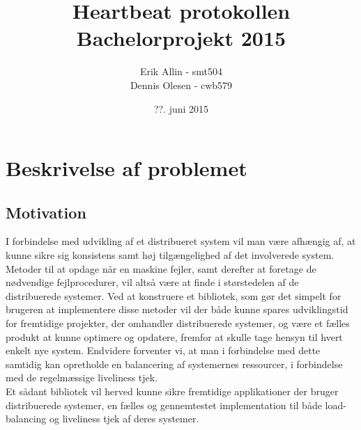 \documentclass[a4paper,12pt]{article}
\title{Heartbeat protokollen
\\
Bachelorprojekt 2015}
\author{Erik Allin - smt504 \\ Dennis Olesen - cwb579}
\date{??. juni 2015}
\begin{document}
\maketitle
\newpage


\section*{Beskrivelse af problemet}
\subsection*{Motivation}
I forbindelse med udvikling af et distribueret system vil man være afhængig af, at kunne sikre sig konsistens samt høj tilgængelighed af det involverede system. Metoder til at opdage når en maskine fejler, samt derefter at foretage de nødvendige fejlprocedurer, vil altså være at finde i størstedelen af de distribuerede systemer.
Ved at konstruere et bibliotek, som gør det simpelt for brugeren at implementere disse metoder vil der både kunne spares udviklingstid for fremtidige projekter, der omhandler distribuerede systemer, og være et fælles produkt at kunne optimere og opdatere, fremfor at skulle tage hensyn til hvert enkelt nye system. Endvidere forventer vi, at man i forbindelse med dette samtidig kan opretholde en balancering af systemernes ressourcer, i forbindelse med de regelmæssige liveliness tjek. 
\\
Et sådant bibliotek vil herved kunne sikre fremtidige applikationer der bruger distribuerede systemer, en fælles og gennemtestet implementation til både load-balancing og liveliness tjek af deres systemer.
\end{document}
